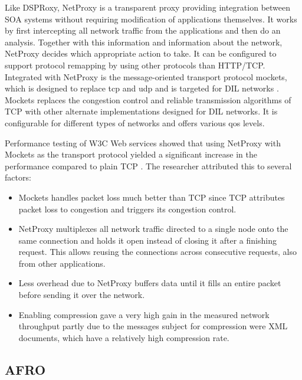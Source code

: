 Like DSPRoxy, NetProxy is a transparent proxy providing integration between SOA
systems without requiring modification of applications themselves. It works by
first intercepting all network traffic from the applications and then do an
analysis. Together with this information and information about the network,
NetProxy decides which appropriate action to take. It can be configured to
support protocol remapping by using other protocols than HTTP/TCP. Integrated
with NetProxy is the message-oriented transport protocol \gls{mockets}, which is
designed to replace \gls{tcp} and \gls{udp} and is targeted for DIL networks
\cite{suri-netproxy}. Mockets replaces the congestion control and reliable
transmission algorithms of TCP with other alternate implementations designed for
DIL networks. It is configurable for different types of networks and offers
various \gls{qos} levels.

Performance testing of W3C Web services showed that using NetProxy with Mockets as
the transport protocol yielded a significant increase in the performance
compared to plain TCP \cite{suri-netproxy}. The researcher attributed this to
several factors:

\begin{itemize}

    \item Mockets handles packet loss much better than TCP since TCP attributes
    packet loss to congestion and triggers its congestion control.

    \item NetProxy multiplexes all network traffic directed to a single node
    onto the same connection and holds it open instead of closing it after a
    finishing request. This allows reusing the connections across consecutive
    requests, also from other applications.

    \item Less overhead due to NetProxy buffers data until it fills an
    entire packet before sending it over the network.

    \item Enabling compression gave a very high gain in the measured network
    throughput partly due to the messages subject for compression were XML
    documents, which have a relatively high compression rate.

\end{itemize}

\subsection{AFRO}

